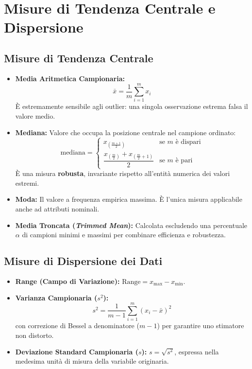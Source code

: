\FloatBarrier
\section{Misure di Tendenza Centrale e Dispersione}

\FloatBarrier
\subsection{Misure di Tendenza Centrale}
\begin{itemize}
    \item \textbf{Media Aritmetica Campionaria:}
    \begin{equation}
        \bar{x} = \frac{1}{m} \sum_{i=1}^m x_i
    \end{equation}
    \`E estremamente sensibile agli outlier: una singola osservazione estrema falsa il valore medio.
    \item \textbf{Mediana:} Valore che occupa la posizione centrale nel campione ordinato:
    \begin{equation}
        \text{mediana} = \begin{cases}
        x_{\left(\frac{m+1}{2}\right)} & \text{se } m \text{ \`e dispari} \\[6pt]
        \dfrac{x_{\left(\frac{m}{2}\right)} + x_{\left(\frac{m}{2} + 1\right)}}{2} & \text{se } m \text{ \`e pari}
        \end{cases}
    \end{equation}
    \`E una misura \textbf{robusta}, invariante rispetto all'entit\`a numerica dei valori estremi.
    \item \textbf{Moda:} Il valore a frequenza empirica massima. \`E l'unica misura applicabile anche ad attributi nominali.
    \item \textbf{Media Troncata (\textit{Trimmed Mean}):} Calcolata escludendo una percentuale $\alpha$ di campioni minimi e massimi per combinare efficienza e robustezza.
\end{itemize}

\FloatBarrier
\subsection{Misure di Dispersione dei Dati}
\begin{itemize}
    \item \textbf{Range (Campo di Variazione):} $\text{Range} = x_{\max} - x_{\min}$.
    \item \textbf{Varianza Campionaria ($s^2$):}
    \begin{equation}
        s^2 = \frac{1}{m-1} \sum_{i=1}^m (x_i - \bar{x})^2
    \end{equation}
    con correzione di Bessel a denominatore ($m-1$) per garantire uno stimatore non distorto.
    \item \textbf{Deviazione Standard Campionaria ($s$):} $s = \sqrt{s^2}$, espressa nella medesima unit\`a di misura della variabile originaria.
\end{itemize}

